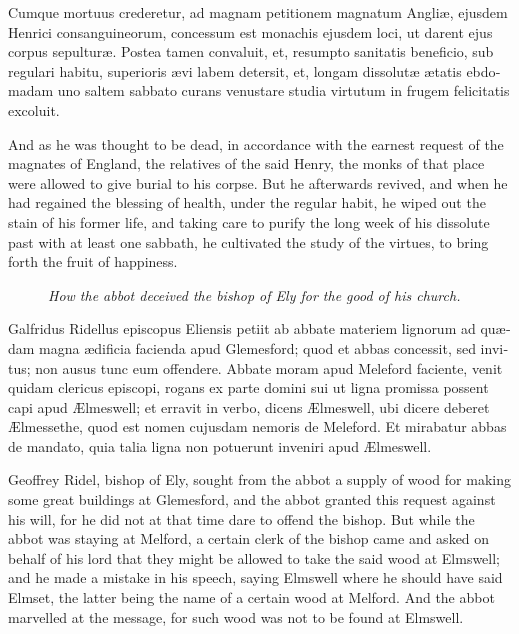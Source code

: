 \documentclass{book}
\newcommand{\blockhead}[4][]{
\begin{figure}
\centering
\vspace{#4}
\parbox{2.75cm}{\begin{center}\footnotesize \color{BrickRed} \emph{#2}\\ #1 \end{center}}
\end{figure}
}
\begin{document}
\begin{paracol}{2}
\switchcolumn*

\begin{otherlanguage}{latin}
Cumque mortuus crederetur, ad magnam petitionem magnatum Angli\ae{}, ejusdem Henrici consanguineorum, concessum est monachis ejusdem loci, ut darent ejus corpus sepultur\ae{}. Postea tamen convaluit, et, resumpto sanitatis beneficio, sub regulari habitu, superioris \ae{}vi labem detersit, et, longam dissolut\ae{} \ae{}tatis ebdomadam uno saltem sabbato curans venustare studia virtutum in frugem felicitatis excoluit.
\end{otherlanguage}

\switchcolumn

And as he was thought to be dead, in accordance with the earnest request of the magnates of England, the relatives of the said Henry, the monks of that place were allowed to give burial to his corpse. But he afterwards revived, and when he had regained the blessing of health, under the regular habit, he wiped out the stain of his former life, and taking care to purify the long week of his dissolute past with at least one sabbath, he cultivated the study of the virtues, to bring forth the fruit of happiness.


\switchcolumn*

\clearpage

\begin{otherlanguage}{latin}
\blockhead{How the abbot deceived the bishop of Ely for the good of his church.}{4}{-.1cm}
Galfridus Ridellus episcopus Eliensis petiit ab abbate materiem lignorum ad qu\ae{}dam magna \ae{}dificia  facienda apud Glemesford; quod et abbas concessit, sed invitus; non ausus tunc eum offendere. Abbate moram apud Meleford faciente, venit quidam clericus episcopi, rogans ex parte domini sui ut ligna promissa possent capi apud \AE{}lmeswell; et erravit in verbo, dicens \AE{}lmeswell, ubi dicere deberet \AE{}lmessethe, quod est nomen cujusdam nemoris de Meleford. Et mirabatur abbas de mandato, quia talia ligna non potuerunt inveniri apud \AE{}lmeswell. 


\end{otherlanguage}

\switchcolumn

Geoffrey Ridel, bishop of Ely, sought from the abbot a supply of wood for making some great buildings at Glemesford, and the abbot granted this request against his will, for he did not at that time dare to offend the bishop. But while the abbot was staying at Melford, a certain clerk of the bishop came and asked on behalf of his lord that they might be allowed to take the said wood at Elmswell; and he made a mistake in his speech, saying Elmswell where he should have said Elmset, the latter being the name of a certain wood at Melford. And the abbot marvelled at the message, for such wood was not to be found at Elmswell.


\end{paracol}
\end{document}
